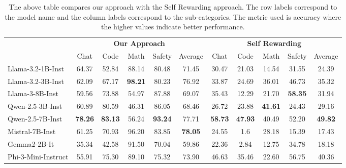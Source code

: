 \begin{table*}[htbp!]
\centering
\setlength{\tabcolsep}{4pt} 

\begin{tabular}{l | ccccc | ccccc }
\hline
\rowcolor{apricot} 
\multirow{0}{*}{\textbf{Models}} & \multicolumn{5}{c|}{\textbf{Our Approach}} & \multicolumn{5}{c}{\textbf{Self Rewarding}} \\
\cmidrule(lr){2-6} \cmidrule(lr){7-11}
 & Chat & Code & Math & Safety & Average & Chat & Code & Math & Safety & Average  \\ \hline
Llama-3.2-1B-Inst & 64.37 & 52.84 & 88.14 & 80.48 & 71.45 & 30.47 & 21.03 & 14.54 & 31.55 & 24.39\\ \hline
\rowcolor{lightgray}Llama-3.2-3B-Inst & 62.09 & 67.17 & \textbf{98.21} & 80.23 & 76.92 & 33.87 & 24.69 & 36.01 & 46.73 & 35.32\\ \hline
Llama-3-8B-Inst & 59.56 & 73.88 & 54.97 & 87.88 & 69.07 & 35.43 & 12.29 & 21.70 & \textbf{58.35} & 31.94\\ \hline
\rowcolor{lightgray}Qwen-2.5-3B-Inst & 60.89  & 80.59  & 46.31  & 86.05 & 68.46 & 26.72 & 23.88 & \textbf{41.61} & 24.43 & 29.16\\ \hline
Qwen-2.5-7B-Inst & \textbf{78.26}  & \textbf{83.13}  & 56.24  & \textbf{93.24} & 77.71 & \textbf{58.73} & \textbf{47.93} & 40.49 & 52.20 & \textbf{49.82}\\ \hline
\rowcolor{lightgray}Mistral-7B-Inst & 61.25 & 70.93  & 96.20 & 83.85 & \textbf{78.05} & 24.55 & 1.6 & 28.18 & 15.39 &  17.43\\ \hline
Gemma2-2B-It & 35.34 & 42.58  & 91.50 & 70.04 & 59.86 & 22.36 & 2.84 & 12.75 & 34.78 & 18.18\\ \hline
\rowcolor{lightgray}Phi-3-Mini-Instruct  & 55.91 & 75.30 & 89.10 & 75.32 & 73.90 & 46.63 & 35.46 & 22.60 & 56.75 & 40.36 \\ \hline
\end{tabular}
\caption{The above table compares our approach with the Self Rewarding approach. The row labels correspond to the model name and the column labels correspond to the sub-categories. The metric used is accuracy where the higher values indicate better performance. }
\label{tab:reward_bench}
\end{table*}




